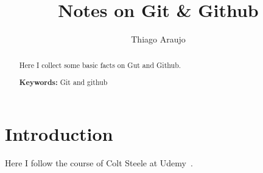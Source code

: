 \documentclass[a4paper,11pt]{amsart}
\begin{document}


\title[Notes on Git \& Github]{Notes on Git \& Github}

\author{Thiago Araujo}



\begin{abstract}
Here I collect some basic facts on Gut and Github.

\bigskip

\noindent \textbf{Keywords:} Git and github
\end{abstract}

\maketitle

\setcounter{tocdepth}{2}
\tableofcontents


\section*{Introduction}

Here I follow the course of Colt Steele at Udemy~\cite{csteele}.






%

\clearpage



\end{document}
